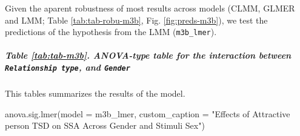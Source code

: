 \documentclass[
  bookmarksnumbered]{article}
\newenvironment{Shaded}{\begin{snugshade}}{\end{snugshade}}
\newcommand{\AttributeTok}[1]{\textcolor[rgb]{0.80,0.80,0.80}{#1}}
\newcommand{\FunctionTok}[1]{\textcolor[rgb]{0.94,0.94,0.56}{#1}}
\newcommand{\NormalTok}[1]{\textcolor[rgb]{0.80,0.80,0.80}{#1}}
\newcommand{\StringTok}[1]{\textcolor[rgb]{0.80,0.58,0.58}{#1}}
\begin{document}
Given the aparent robustness of most results across models (CLMM, GLMER and LMM; Table \ref{tab:tab-robu-m3b}, Fig. \ref{fig:preds-m3b}), we test the predictions of the hypothesis from the LMM (\texttt{m3b\_lmer}).

\subparagraph{\texorpdfstring{Table \ref{tab:tab-m3b}. ANOVA-type table for the interaction between \texttt{Relationship\ type}, and \texttt{Gender}}{Table \ref{tab:tab-m3b}. ANOVA-type table for the interaction between Relationship type, and Gender}}\label{table-reftabtab-m3b.-anova-type-table-for-the-interaction-between-relationship-type-and-gender}

This tables summarizes the results of the model.

\begin{Shaded}
\begin{Highlighting}[]
\FunctionTok{anova.sig.lmer}\NormalTok{(}\AttributeTok{model =}\NormalTok{ m3b\_lmer, }\AttributeTok{custom\_caption =} \StringTok{"Effects of Attractive person TSD on SSA Across }
\StringTok{              Gender and Stimuli Sex"}\NormalTok{)}
\end{Highlighting}
\end{Shaded}

\begin{table}[H]
\centering
\caption{\label{tab:tab-m3b}Effects of Attractive person TSD on SSA Across 
              Gender and Stimuli Sex}
\centering
{}
\end{table}
\end{document}
